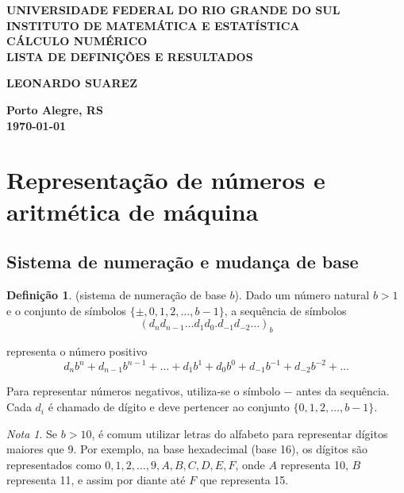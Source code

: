 \documentclass[12pt]{article}
\theoremstyle{plain}
\theoremstyle{definition}
\newtheorem{defn}{Definição}[section]
\theoremstyle{remark}
\newtheorem*{rem}{Nota}
\begin{document}
\begin{center}
    \textbf{\large UNIVERSIDADE FEDERAL DO RIO GRANDE DO SUL} \\
    \textbf{\large INSTITUTO DE MATEMÁTICA E ESTATÍSTICA} \\
    \vspace{3cm}
    \textbf{\Large CÁLCULO NUMÉRICO} \\
    \vspace{1cm}
    \textbf{\large LISTA DE DEFINIÇÕES E RESULTADOS} \\
    \vspace{3cm}

    \textbf{LEONARDO SUAREZ}

    \vfill
    \textbf{\large Porto Alegre, RS} \\
    \textbf{\large \today}
\end{center}

\newpage
\tableofcontents
\newpage

\section{Representação de números e aritmética de máquina}

\subsection{Sistema de numeração e mudança de base}

\begin{defn} (sistema de numeração de base \(b\)). 
    Dado um número natural \(b > 1\) e o conjunto de símbolos \(\{\pm, 0, 1, 2, \ldots, b-1\}\), a sequência de símbolos
    \begin{equation}
        (d_n d_{n-1} \ldots d_1 d_0 . d_{-1} d_{-2} \ldots)_b
    \end{equation}

    representa o número positivo
    \begin{equation}
        d_n b^n + d_{n-1} b^{n-1} + \ldots + d_1 b^1 + d_0 b^0 + d_{-1} b^{-1} + d_{-2} b^{-2} + \ldots
    \end{equation}

    Para representar números negativos, utiliza-se o símbolo \(-\) antes da sequência. Cada \(d_i\) é chamado de dígito e deve pertencer ao conjunto \(\{0, 1, 2, \ldots, b-1\}\).
\end{defn}

\begin{rem}
    Se \(b > 10\), é comum utilizar letras do alfabeto para representar dígitos maiores que 9. Por exemplo, na base hexadecimal (base 16), os dígitos são representados como \(0, 1, 2, \ldots, 9, A, B, C, D, E, F\), onde \(A\) representa 10, \(B\) representa 11, e assim por diante até \(F\) que representa 15.
\end{rem}
\end{document}
